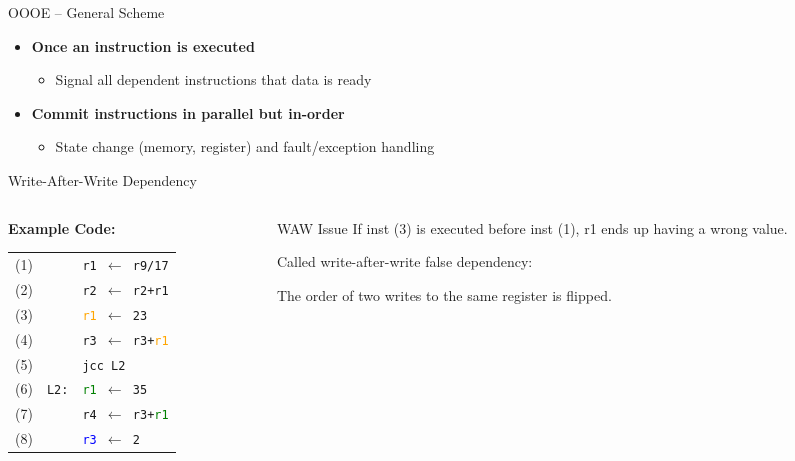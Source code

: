 \documentclass[aspectratio=169,12pt]{beamer}
\begin{document}
\begin{frame}{OOOE -- General Scheme}
\begin{itemize}
    \item \textbf{Once an instruction is executed}
    \begin{itemize}
      \item Signal all dependent instructions that data is ready
    \end{itemize}
    
    \item \textbf{Commit instructions in parallel but in-order}
    \begin{itemize}
      \item State change (memory, register) and fault/exception handling
    \end{itemize}
  \end{itemize}
\end{frame}

\begin{frame}{Write-After-Write Dependency}
  \begin{columns}
    \begin{column}{0.5\textwidth}
      \textbf{Example Code:} \\
      \begin{tabular}{lll}
        (1) & & \texttt{\textcolor{r1color}{r1} $\leftarrow$ r9/17} \\
        (2) & & \texttt{\textcolor{r2color}{r2} $\leftarrow$ \textcolor{r2color}{r2}+\textcolor{r1color}{r1}} \\
        (3) & & \texttt{\textcolor{orange}{r1} $\leftarrow$ 23} \\
        (4) & & \texttt{\textcolor{r3color}{r3} $\leftarrow$ \textcolor{r3color}{r3}+\textcolor{orange}{r1}} \\
        (5) & & \texttt{jcc L2} \\
        (6) & \texttt{L2:} & \texttt{\textcolor{green}{r1} $\leftarrow$ 35} \\
        (7) & & \texttt{\textcolor{r4color}{r4} $\leftarrow$ \textcolor{r3color}{r3}+\textcolor{green}{r1}} \\
        (8) & & \texttt{\textcolor{blue}{r3} $\leftarrow$ 2} \\
      \end{tabular}
    \end{column}
    
    \begin{column}{0.5\textwidth}
      \begin{block}{WAW Issue}
        If inst (3) is executed before inst (1), r1 ends up having a wrong value.
        
        \vspace{0.3cm}
        
        Called \alert{write-after-write false dependency}:
        
        The order of two writes to the same register is flipped.
      \end{block}
    \end{column}
  \end{columns}
\end{frame}
\end{document}
